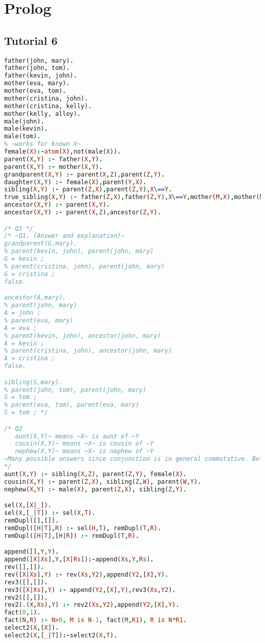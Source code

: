 \documentclass[fontsize=10pt]{slnotes}
\begin{document}
\clearpage\chapter{Prolog}
\section{Tutorial 6}
\begin{lstlisting}[escapechar=\~,escapebegin=\rmfamily,language=Prolog]
father(john, mary).
father(john, tom).
father(kevin, john).
mother(eva, mary).
mother(eva, tom).
mother(cristina, john).
mother(cristina, kelly).
mother(kelly, alloy).
male(john).
male(kevin).
male(tom).
% ~works for known X~
female(X):-atom(X),not(male(X)).
parent(X,Y) :- father(X,Y).
parent(X,Y) :- mother(X,Y).
grandparent(X,Y) :- parent(X,Z),parent(Z,Y).
daughter(X,Y) :- female(X),parent(Y,X).
sibling(X,Y) :- parent(Z,X),parent(Z,Y),X\==Y.
true_sibling(X,Y) :- father(Z,X),father(Z,Y),X\==Y,mother(M,X),mother(M,Y).
ancestor(X,Y) :- parent(X,Y).
ancestor(X,Y) :- parent(X,Z),ancestor(Z,Y).

/* Q1 */
/* ~Q1. (Answer and explanation)~
grandparent(G,mary).
% parent(kevin, john), parent(john, mary)
G = kevin ;
% parent(cristina, john), parent(john, mary)
G = cristina ;
false.

ancestor(A,mary).
% parent(john, mary)
A = john ;
% parent(eva, mary)
A = eva ;
% parent(kevin, john), ancestor(john, mary)
A = kevin ;
% parent(cristina, john), ancestor(john, mary)
A = cristina ;
false.

sibling(S,mary).
% parent(john, tom), parent(john, mary)
S = tom ;
% parent(eva, tom), parent(eva, mary)
S = tom ; */

/* Q2
   aunt(X,Y)~ means ~X~ is aunt of ~Y
   cousin(X,Y)~ means ~X~ is cousin of ~Y
   nephew(X,Y)~ means ~X~ is nephew of ~Y
~Many possible answers since conjunction is in general commutative. Below is one of the possible answers.~
*/
aunt(X,Y) :- sibling(X,Z), parent(Z,Y), female(X).
cousin(X,Y) :- parent(Z,X), sibling(Z,W), parent(W,Y).
nephew(X,Y) :- male(X), parent(Z,X), sibling(Z,Y).

sel(X,[X|_]).
sel(X,[_|T]) :- sel(X,T).
remDupl([],[]).
remDupl([H|T],R) :- sel(H,T), remDupl(T,R).
remDupl([H|T],[H|R]) :- remDupl(T,R).

append([],Y,Y).
append([X|Xs],Y,[X|Rs]):-append(Xs,Y,Rs).
rev([],[]).
rev([X|Xs],Y) :- rev(Xs,Y2),append(Y2,[X],Y).
rev3([],[]).
rev3([X|Xs],Y) :- append(Y2,[X],Y),rev3(Xs,Y2).
rev2([],[]).
rev2(.(X,Xs),Y) :- rev2(Xs,Y2),append(Y2,[X],Y).
fact(0,1).
fact(N,R) :- N>0, M is N-1, fact(M,R1), R is N*R1.
select2(X,[X]).
select2(X,[_|T]):-select2(X,T).


\end{lstlisting}
\end{document}
